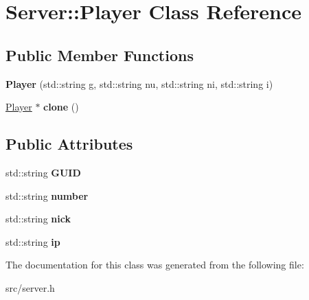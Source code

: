 \hypertarget{class_server_1_1_player}{
\section{Server::Player Class Reference}
\label{class_server_1_1_player}
}
\subsection*{Public Member Functions}
\begin{DoxyCompactItemize}
\item 
\hypertarget{class_server_1_1_player_ac3be27eae7f26b171e429ff4bd72b91c}{
{\bfseries Player} (std::string g, std::string nu, std::string ni, std::string i)}
\label{class_server_1_1_player_ac3be27eae7f26b171e429ff4bd72b91c}

\item 
\hypertarget{class_server_1_1_player_a0f53bf1afe75430d5dc2bae1d8011990}{
\hyperlink{class_server_1_1_player}{Player} $\ast$ {\bfseries clone} ()}
\label{class_server_1_1_player_a0f53bf1afe75430d5dc2bae1d8011990}

\end{DoxyCompactItemize}
\subsection*{Public Attributes}
\begin{DoxyCompactItemize}
\item 
\hypertarget{class_server_1_1_player_a3e2fd446b154cc2698caa86d57077256}{
std::string {\bfseries GUID}}
\label{class_server_1_1_player_a3e2fd446b154cc2698caa86d57077256}

\item 
\hypertarget{class_server_1_1_player_a714c1b04af42be7d419cd685de1bd689}{
std::string {\bfseries number}}
\label{class_server_1_1_player_a714c1b04af42be7d419cd685de1bd689}

\item 
\hypertarget{class_server_1_1_player_a9c680738218d77b29d4d892090c05881}{
std::string {\bfseries nick}}
\label{class_server_1_1_player_a9c680738218d77b29d4d892090c05881}

\item 
\hypertarget{class_server_1_1_player_a96f44de96c3432859b79fb642ae8efd6}{
std::string {\bfseries ip}}
\label{class_server_1_1_player_a96f44de96c3432859b79fb642ae8efd6}

\end{DoxyCompactItemize}


The documentation for this class was generated from the following file:\begin{DoxyCompactItemize}
\item 
src/server.h\end{DoxyCompactItemize}
